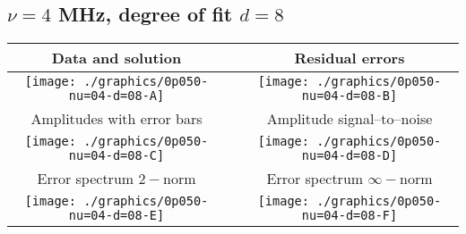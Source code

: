 

% 

\clearpage{}
\break{}

\subsection{$\nu = 4$ MHz, degree of fit $d = 8$}

\begin{table}[h]
    \begin{center}
        \begin{tabular}{ccc}
            Data and solution & \quad & Residual errors \\\hline
            \texttt{[image: ./graphics/0p050-nu=04-d=08-A]} &&
            \texttt{[image: ./graphics/0p050-nu=04-d=08-B]} \\[15pt]
            Amplitudes with error bars && Amplitude signal--to--noise \\\hline
            \texttt{[image: ./graphics/0p050-nu=04-d=08-C]} &&
            \texttt{[image: ./graphics/0p050-nu=04-d=08-D]} \\[15pt]
            Error spectrum $2-$norm && Error spectrum $\infty-$norm \\\hline
            \texttt{[image: ./graphics/0p050-nu=04-d=08-E]} &&
            \texttt{[image: ./graphics/0p050-nu=04-d=08-F]} \\[15pt]
        \end{tabular}
    \end{center}
\label{fig:elev=50, nu=4}
\end{table}



\endinput
